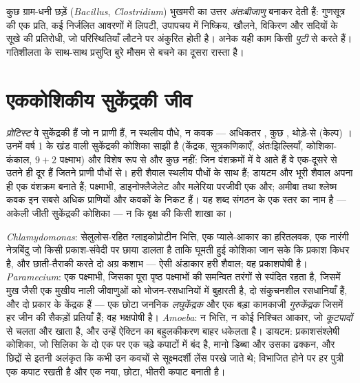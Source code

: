 \begin{remark}[प्रसुप्ति]\label{rem:b2:unicellular-diversity:spores}
कुछ ग्राम-धनी छड़ें (\emph{Bacillus}, \emph{Clostridium}) भुखमरी का उत्तर
\emph{अंतःबीजाणु} बनाकर देती हैं: गुणसूत्र की एक प्रति, कई निर्जलित
आवरणों में लिपटी, उपापचय में निष्क्रिय, खौलने, विकिरण और सदियों के सूखे
की प्रतिरोधी, जो परिस्थितियाँ लौटने पर अंकुरित होती है। अनेक 
यही काम किसी \emph{पुटी} से करते हैं। गतिशीलता के साथ-साथ प्रसुप्ति बुरे
मौसम से बचने का दूसरा रास्ता है।
\end{remark}

\section{एककोशिकीय सुकेंद्रकी जीव}

\begin{definition}[प्रोटिस्ट: एक स्तर, समूह नहीं]\label{def:b2:unicellular-diversity:protist}
\emph{प्रोटिस्ट} वे सुकेंद्रकी हैं जो न प्राणी हैं, न
स्थलीय पौधे, न कवक --- अधिकतर , कुछ , थोड़े-से (केल्प)
। उनमें वर्ष 1 के खंड वाली सुकेंद्रकी कोशिका साझी है (केंद्रक,
सूत्रकणिकाएँ, अंतःझिल्लियाँ, कोशिका-कंकाल, $9+2$ पक्ष्माभ) और विशेष रूप
से और कुछ नहीं: जिन वंशक्रमों में वे आते हैं वे एक-दूसरे से उतने ही दूर
हैं जितने प्राणी पौधों से। हरी शैवाल स्थलीय पौधों के साथ हैं; डायटम और
भूरी शैवाल अपना ही एक वंशक्रम बनाते हैं; पक्ष्माभी, डाइनोफ्लैजेलेट और
मलेरिया परजीवी एक और; अमीबा तथा श्लेष्म कवक इन सबसे अधिक प्राणियों और
कवकों के निकट हैं। यह शब्द संगठन के एक स्तर का नाम है --- अकेली जीती
सुकेंद्रकी कोशिका --- न कि वृक्ष की किसी शाखा का।
\end{definition}

\begin{example}[अकेली सुकेंद्रकी कोशिका होने के चार ढंग]\label{ex:b2:unicellular-diversity:four}
\emph{Chlamydomonas}: सेलुलोस-रहित ग्लाइकोप्रोटीन भित्ति, एक प्याले-आकार
का हरितलवक, एक नारंगी नेत्रबिंदु जो किसी प्रकाश-संवेदी पर छाया डालता है
ताकि घूमती हुई कोशिका जान सके कि प्रकाश किधर है, और छाती-तैराकी करते दो
अग्र कशाभ --- ऐसी अंडाकार हरी शैवाल; वह प्रकाशपोषी है।
\emph{Paramecium}: एक पक्ष्माभी, जिसका पूरा पृष्ठ पक्ष्माभों की समन्वित
तरंगों से स्पंदित रहता है, जिसमें मुख जैसी एक मुखीय नाली जीवाणुओं को
भोजन-रसधानियों में बुहारती है, दो संकुचनशील रसधानियाँ हैं, और दो प्रकार
के केंद्रक हैं --- एक छोटा जननिक \emph{लघुकेंद्रक} और एक बड़ा कामकाजी
\emph{गुरुकेंद्रक} जिसमें हर जीन की सैकड़ों प्रतियाँ हैं; वह भक्षपोषी है।
\emph{Amoeba}: न भित्ति, न कोई निश्चित आकार, जो \emph{कूटपादों} से चलता
और खाता है, और उन्हें ऐक्टिन का बहुलकीकरण बाहर धकेलता है। डायटम:
प्रकाशसंश्लेषी कोशिका, जो सिलिका के दो एक पर एक चढ़े कपाटों में बंद है,
मानो डिब्बा और उसका ढक्कन, और छिद्रों से इतनी अलंकृत कि कभी उन कवचों से
सूक्ष्मदर्शी लेंस परखे जाते थे; विभाजित होने पर हर पुत्री एक कपाट रखती है
और एक नया, छोटा, भीतरी कपाट बनाती है।
\end{example}

